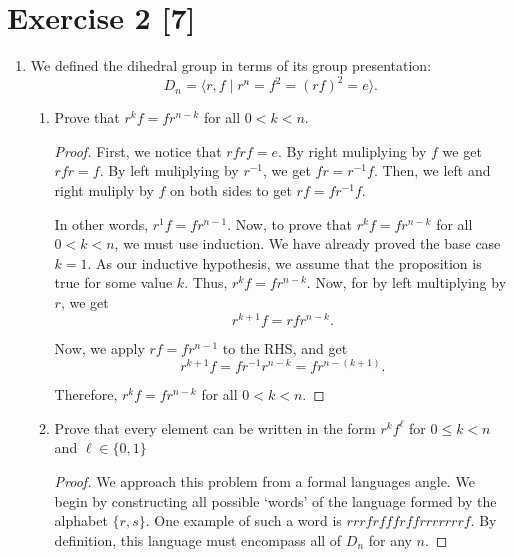 \documentclass{article}
\begin{document}
\section*{Exercise 2 [7]}
\begin{enumerate}
    \item {
        We defined the dihedral group in terms of its group presentation: 
        \[         D_n = \langle r, f \mid r^n = f^2 = (rf)^2 = e \rangle.       \]
      
        \begin{enumerate}
            \item {
                Prove that \(r^kf = fr^{n-k}\) for all \(0 < k < n\).

                \begin{proof}
                    First, we notice that \(rfrf = e\). By right muliplying by 
                    \(f\) we get \(rfr = f\). By left muliplying by \(r^{-1}\), 
                    we get \(fr = r^{-1}f\). Then, we left and right muliply by 
                    \(f\) on both sides to get \(rf = fr^{-1}f\).

                    In other words, \(r^1f = fr^{n-1}\). Now, to prove that 
                    \(r^kf = fr^{n-k}\) for all \(0 < k < n\), we must use 
                    induction. We have already proved the base case \(k = 1\). 
                    As our inductive hypothesis, we assume that the proposition 
                    is true for some value \(k\). Thus, \(r^kf = fr^{n-k}\).
                    Now, for by left multiplying by \(r\), we get 
                    \[r^{k+1}f = rfr^{n-k}.\]

                    Now, we apply \(rf = fr^{n-1}\) to the RHS, and get 
                    \[r^{k+1}f = fr^{-1}r^{n-k} = fr^{n- (k+1)}.\]
                    
                    Therefore, \(r^kf = fr^{n-k}\) for all \(0 < k < n\).
                \end{proof}
            }
            \item {
                Prove that every element can be written in the form \(r^kf^\ell\) 
                for \(0 \leq k < n\) and \(\ell \in \{0, 1\}\)

                \begin{proof}
                    We approach this problem from  a formal languages angle. 
                    We begin by constructing all possible `words' of the language 
                    formed by the alphabet \(\{r, s \}\). One example of such a 
                    word is \(rrrfrfffrffrrrrrrrf\). By definition, this language
                    must encompass all of \(D_n\) for any \(n\). 
                    

\end{proof}}
\end{enumerate}}
\end{enumerate}
\end{document}
